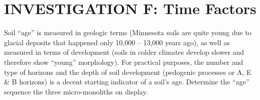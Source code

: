 \documentclass[
  letterpaper,
  twocolumn,
  portrait]{scrbook}
\begin{document}
\hypertarget{investigation-f-time-factors}{%
\section{INVESTIGATION F: Time
Factors}\label{investigation-f-time-factors}}

Soil ``age'' is measured in geologic terms (Minnesota soils are quite
young due to glacial deposits that happened only 10,000 -- 13,000 years
ago), as well as measured in terms of development (soils in colder
climates develop slower and therefore show ``young'' morphology). For
practical purposes, the number and type of horizons and the depth of
soil development (pedogenic processes or A, E \& B horizons) is a decent
starting indicator of a soil's age. Determine the ``age'' sequence the
three micro-monoliths on display.

 
  \providecommand{\huxb}[2]{\arrayrulecolor[RGB]{#1}\global\arrayrulewidth=#2pt}
  \providecommand{\huxvb}[2]{\color[RGB]{#1}\vrule width #2pt}
  \providecommand{\huxtpad}[1]{\rule{0pt}{#1}}
  \providecommand{\huxbpad}[1]{\rule[-#1]{0pt}{#1}}
\end{document}

